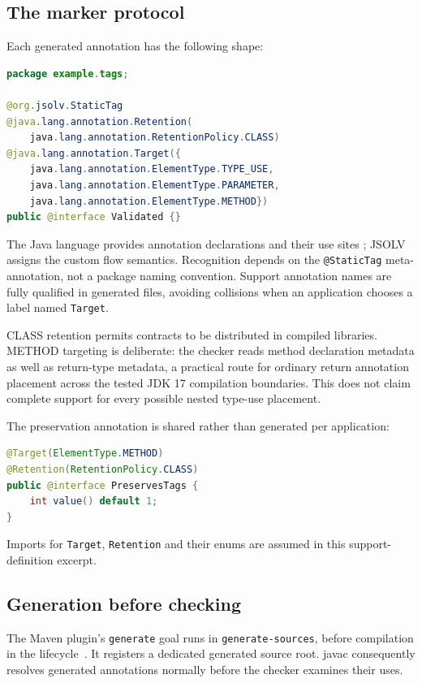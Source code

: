 \documentclass[11pt]{article}
\begin{document}
\subsection{The marker protocol}
Each generated annotation has the following shape:
\begin{lstlisting}[language=Java]
package example.tags;

@org.jsolv.StaticTag
@java.lang.annotation.Retention(
    java.lang.annotation.RetentionPolicy.CLASS)
@java.lang.annotation.Target({
    java.lang.annotation.ElementType.TYPE_USE,
    java.lang.annotation.ElementType.PARAMETER,
    java.lang.annotation.ElementType.METHOD})
public @interface Validated {}
\end{lstlisting}
The Java language provides annotation declarations and their use sites
\cite{jls}; JSOLV assigns the custom flow semantics. Recognition depends on
the \texttt{@StaticTag} meta-annotation, not a package naming convention.
Support annotation names are fully qualified in generated files, avoiding
collisions when an application chooses a label named \texttt{Target}.

CLASS retention permits contracts to be distributed in compiled libraries.
METHOD targeting is deliberate: the checker reads method declaration metadata
as well as return-type metadata, a practical route for ordinary return
annotation placement across the tested JDK 17 compilation boundaries. This
does not claim complete support for every possible nested type-use placement.

The preservation annotation is shared rather than generated per application:
\begin{lstlisting}[language=Java]
@Target(ElementType.METHOD)
@Retention(RetentionPolicy.CLASS)
public @interface PreservesTags {
    int value() default 1;
}
\end{lstlisting}
Imports for \texttt{Target}, \texttt{Retention} and their enums are assumed
in this support-definition excerpt.

\subsection{Generation before checking}
The Maven plugin's \texttt{generate} goal runs in \texttt{generate-sources},
before compilation in the lifecycle~\cite{maven}. It registers a dedicated
generated source root. javac consequently resolves generated annotations
normally before the checker examines their uses.
\end{document}
